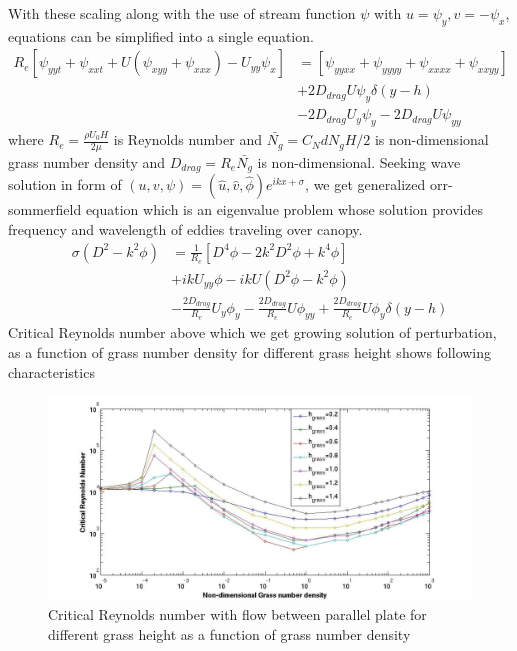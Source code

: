 \documentclass[aps,preprint,floatfix,prl]{revtex4-1}
\begin{document}
With these scaling along with the use of stream function $\psi$ with $u = \psi_{y}, v= -\psi_x$, equations can be simplified into a single equation.
\begin{equation}
\begin{split}
 R_{e}\left[\psi_{yyt}+\psi_{xxt}+U\left(\psi_{xyy}+\psi_{xxx}\right)-U_{yy}\psi_{x} \right] &=\left[\psi_{yyxx}+\psi_{yyyy}+\psi_{xxxx}+\psi_{xxyy} \right]\\
& + 2D_{drag}U\psi_{y}\delta(y-h)\\
& - 2D_{drag}U_{y}\psi_{y} -2D_{drag}U\psi_{yy}
\end{split}
\end{equation}
where $R_{e}= \frac{\rho U_0 H}{2\mu}$ is Reynolds number and $\bar{N_g} = C_N d N_g H/2$ is non-dimensional grass number density and  $D_{drag} = R_{e}\bar{N_{g}}$ is non-dimensional.
Seeking wave solution in form of $\left(u,v,\psi \right)= \left(\hat u, \hat v, \hat\phi \right)e^{ikx+\sigma}$, we get generalized orr-sommerfield equation 
which is an eigenvalue problem whose solution provides frequency and wavelength of eddies traveling over canopy.
\begin{equation}
\begin{split}
\sigma \left(D^2-k^2\phi \right) &= \frac{1}{R_{e}}\left[D^4\phi -2k^{2}D^2\phi +k^{4}\phi \right]\\
				  & +ikU_{yy}\phi-ikU\left(D^2\phi-k^2\phi \right)\\
 & -\frac{2D_{drag}}{R_{e}}U_{y}\phi_{y}-\frac{2D_{drag}}{R_{e}}U\phi_{yy}+\frac{2D_{drag}}{R_{e}}U\phi_{y}\delta(y-h)
\end{split}
\end{equation}
Critical Reynolds number above which we get growing solution of perturbation, as a function of grass number density for different grass height shows following characteristics 
  \begin{figure}[htb!]
  \includegraphics[scale=0.35]{Instability2}
\caption{Critical Reynolds number with flow between parallel plate for different grass height as a function of grass number density}
\end{figure}
\end{document}
